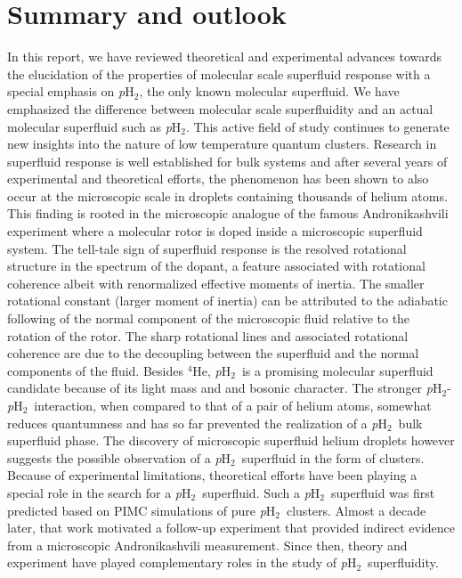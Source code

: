 \documentclass[12pt]{iopart}
\newcommand{\phtwo}{{\em p}H$_2$}
\begin{document}
\section{Summary and outlook} \label{sec:summary}

In this report, we have reviewed theoretical and experimental advances towards the elucidation of the properties of molecular scale superfluid response with a special emphasis on \phtwo, the only known molecular superfluid.
We have emphasized the difference between molecular scale superfluidity and an actual molecular superfluid such as \phtwo.
This active field of study continues to generate new insights into the nature of low temperature quantum clusters.
Research in superfluid response is well established for bulk systems and after several years of experimental and theoretical efforts,
the phenomenon has been shown to also occur at the microscopic scale in droplets containing thousands of helium atoms. 
This finding is rooted in the microscopic analogue of the famous Andronikashvili experiment where a molecular rotor is doped inside a microscopic superfluid system. 
The tell-tale sign of superfluid response is the resolved rotational structure in the spectrum of the dopant, a feature associated with rotational coherence albeit with renormalized effective moments of inertia. 
The smaller rotational constant (larger moment of inertia) can be attributed to the adiabatic following of the normal component of the microscopic fluid relative to the rotation of the rotor.
The sharp rotational lines and associated rotational coherence are due to the decoupling between the superfluid and the normal components of the fluid. 
Besides $^4$He, \phtwo~is a promising molecular superfluid candidate because of its light mass and and bosonic character. 
The stronger \phtwo-\phtwo~interaction, when compared to that of a pair of helium atoms, somewhat reduces quantumness and has so far prevented the realization of a \phtwo~bulk superfluid phase. 
The discovery of microscopic superfluid helium droplets however suggests the possible observation of a \phtwo~superfluid in the form of clusters. 
Because of experimental limitations, theoretical efforts have been playing a special role in the search for a \phtwo~superfluid. 
Such a \phtwo~superfluid was first predicted based on PIMC simulations of pure \phtwo~clusters. 
Almost a decade later, that work motivated a follow-up experiment that provided indirect evidence from a microscopic Andronikashvili measurement. 
Since then, theory and experiment have played complementary roles in the study of \phtwo~superfluidity.
\end{document}
